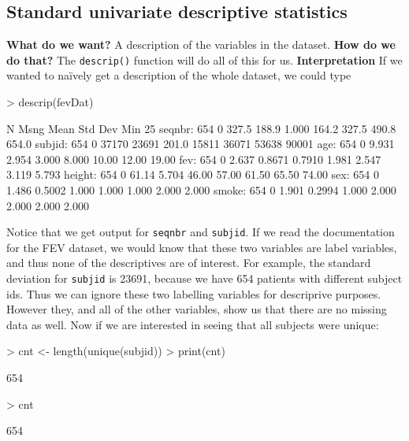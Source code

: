 \documentclass[landscape]{article}
\renewenvironment{Schunk}{\vspace{\topsep}}{\vspace{\topsep}}
\begin{document}
\subsection{Standard univariate descriptive statistics}
{\large \textbf{What do we want?}} \newline
\indent A description of the variables in the dataset. \newline
{\large \textbf{How do we do that?}} \newline
\indent The \texttt{descrip()} function will do all of this for us. \newline
{\large \textbf{Interpretation}}
\newline \indent If we wanted to na\"ively get a description of the whole dataset, we could type
\begin{Schunk}
\begin{Sinput}
> descrip(fevDat)
\end{Sinput}
\begin{Soutput}
          N     Msng  Mean      Std Dev    Min       25%
seqnbr:     654     0   327.5     188.9     1.000     164.2     327.5     490.8     654.0  
subjid:     654     0   37170     23691     201.0     15811     36071     53638     90001  
   age:     654     0   9.931     2.954     3.000     8.000     10.00     12.00     19.00  
   fev:     654     0   2.637     0.8671    0.7910    1.981     2.547     3.119     5.793  
height:     654     0   61.14     5.704     46.00     57.00     61.50     65.50     74.00  
   sex:     654     0   1.486     0.5002    1.000     1.000     1.000     2.000     2.000  
 smoke:     654     0   1.901     0.2994    1.000     2.000     2.000     2.000     2.000  
\end{Soutput}
\end{Schunk}
Notice that we get output for \texttt{seqnbr} and \texttt{subjid}. If we read the documentation for the FEV dataset, we would know that these two variables are label variables, and thus none of the descriptives are of interest. For example, the standard deviation for \texttt{subjid} is 23691, because we have 654 patients with different subject ids. Thus we can ignore these two labelling variables for descriprive purposes. However they, and all of the other variables, show us that there are no missing data as well. Now if we are interested in seeing that all subjects were unique:
\begin{Schunk}
\begin{Sinput}
> cnt <- length(unique(subjid))
> print(cnt)
\end{Sinput}
\begin{Soutput}
[1] 654
\end{Soutput}
\begin{Sinput}
> cnt
\end{Sinput}
\begin{Soutput}
[1] 654
\end{Soutput}
\end{Schunk}
\end{document}
